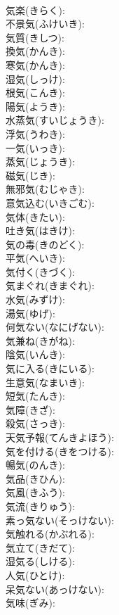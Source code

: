 \documentclass[8pt]{extreport}
\begin{document}
\begin{CJK}{UTF8}{min}
\\	気楽(きらく): 
\\	不景気(ふけいき): 
\\	気質(きしつ): 
\\	換気(かんき): 
\\	寒気(かんき): 
\\	湿気(しっけ): 
\\	根気(こんき): 
\\	陽気(ようき): 
\\	水蒸気(すいじょうき): 
\\	浮気(うわき): 
\\	一気(いっき): 
\\	蒸気(じょうき): 
\\	磁気(じき): 
\\	無邪気(むじゃき): 
\\	意気込む(いきごむ): 
\\	気体(きたい): 
\\	吐き気(はきけ): 
\\	気の毒(きのどく): 
\\	平気(へいき): 
\\	気付く(きづく): 
\\	気まぐれ(きまぐれ): 
\\	水気(みずけ): 
\\	湯気(ゆげ): 
\\	何気ない(なにげない): 
\\	気兼ね(きがね): 
\\	陰気(いんき): 
\\	気に入る(きにいる): 
\\	生意気(なまいき): 
\\	短気(たんき): 
\\	気障(きざ): 
\\	殺気(さっき): 
\\	天気予報(てんきよほう): 
\\	気を付ける(きをつける): 
\\	暢気(のんき): 
\\	気品(きひん): 
\\	気風(きふう): 
\\	気流(きりゅう): 
\\	素っ気ない(そっけない): 
\\	気触れる(かぶれる): 
\\	気立て(きだて): 
\\	湿気る(しける): 
\\	人気(ひとけ): 
\\	呆気ない(あっけない): 
\\	気味(ぎみ): 

\end{CJK}
\end{document}
